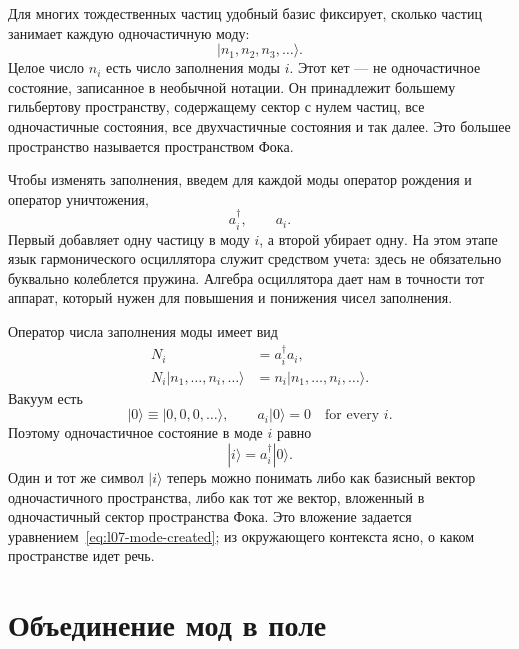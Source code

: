 Для многих тождественных частиц удобный базис фиксирует, сколько частиц занимает каждую одночастичную моду:
\begin{equation}
|n_1,n_2,n_3,\ldots\rangle.
\label{eq:l07-fock-basis}
\end{equation}
Целое число \(n_i\) есть число заполнения моды \(i\). Этот кет — не одночастичное состояние, записанное в необычной нотации. Он принадлежит большему гильбертову пространству, содержащему сектор с нулем частиц, все одночастичные состояния, все двухчастичные состояния и так далее. Это большее пространство называется пространством Фока.

Чтобы изменять заполнения, введем для каждой моды оператор рождения и оператор уничтожения,
\begin{equation}
a_i^\dagger,\qquad a_i.
\end{equation}
Первый добавляет одну частицу в моду \(i\), а второй убирает одну. На этом этапе язык гармонического осциллятора служит средством учета: здесь не обязательно буквально колеблется пружина. Алгебра осциллятора дает нам в точности тот аппарат, который нужен для повышения и понижения чисел заполнения.

Оператор числа заполнения моды имеет вид
\begin{equation}
\begin{aligned}
N_i&=a_i^\dagger a_i,\\
N_i|n_1,\ldots,n_i,\ldots\rangle
&=n_i|n_1,\ldots,n_i,\ldots\rangle.
\end{aligned}
\end{equation}
Вакуум есть
\begin{equation}
|0\rangle\equiv|0,0,0,\ldots\rangle,
\qquad
a_i|0\rangle=0
\quad\text{for every }i.
\label{eq:l07-vacuum}
\end{equation}
Поэтому одночастичное состояние в моде \(i\) равно
\begin{equation}
|i\rangle=a_i^\dagger|0\rangle.
\label{eq:l07-mode-created}
\end{equation}
Один и тот же символ \(|i\rangle\) теперь можно понимать либо как базисный вектор одночастичного пространства, либо как тот же вектор, вложенный в одночастичный сектор пространства Фока. Это вложение задается уравнением~\eqref{eq:l07-mode-created}; из окружающего контекста ясно, о каком пространстве идет речь.

\section{Объединение мод в поле}


